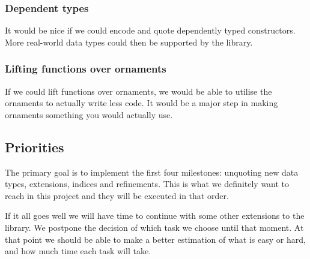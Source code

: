 \subsubsection{Dependent types}\label{sec:plan-deptypes}

It would be nice if we could encode and quote dependently typed
constructors.
More real-world data types could then be supported by the library.

\subsubsection{Lifting functions over ornaments}\label{sec:plan-lifting}

If we could lift functions over ornaments, we would be able to utilise
the ornaments to actually write less code.
It would be a major step in making ornaments something you would
actually use.

\subsection{Priorities}\label{sec:plan-priorities}

The primary goal is to implement the first four milestones: unquoting
new data types, extensions, indices and refinements.
This is what we definitely want to reach in this project and they will
be executed in that order.

If it all goes well we will have time to continue with some other
extensions to the library.
We postpone the decision of which task we choose until that moment.
At that point we should be able to make a better estimation of what is
easy or hard, and how much time each task will take.
